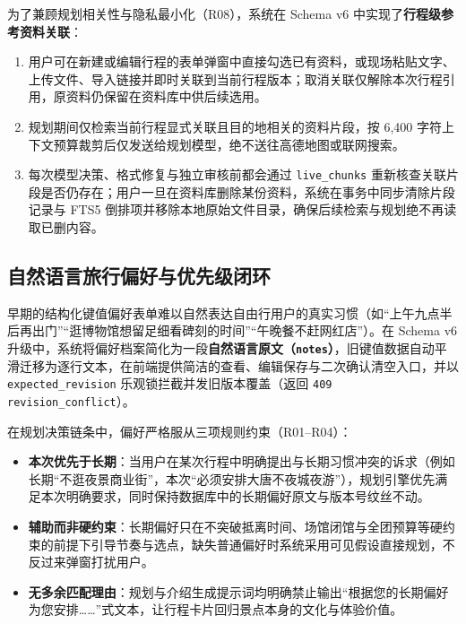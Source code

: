 为了兼顾规划相关性与隐私最小化（R08），系统在 Schema v6 中实现了\textbf{行程级参考资料关联}：
\begin{enumerate}
  \item 用户可在新建或编辑行程的表单弹窗中直接勾选已有资料，或现场粘贴文字、上传文件、导入链接并即时关联到当前行程版本；取消关联仅解除本次行程引用，原资料仍保留在资料库中供后续选用。
  \item 规划期间仅检索当前行程显式关联且目的地相关的资料片段，按 6,400 字符上下文预算裁剪后仅发送给规划模型，绝不送往高德地图或联网搜索。
  \item 每次模型决策、格式修复与独立审核前都会通过 \texttt{live\_chunks} 重新核查关联片段是否仍存在；用户一旦在资料库删除某份资料，系统在事务中同步清除片段记录与 FTS5 倒排项并移除本地原始文件目录，确保后续检索与规划绝不再读取已删内容。
\end{enumerate}

\subsection{自然语言旅行偏好与优先级闭环}

早期的结构化键值偏好表单难以自然表达自由行用户的真实习惯（如“上午九点半后再出门”“逛博物馆想留足细看碑刻的时间”“午晚餐不赶网红店”）。在 Schema v6 升级中，系统将偏好档案简化为一段\textbf{自然语言原文（\texttt{notes}）}，旧键值数据自动平滑迁移为逐行文本，在前端提供简洁的查看、编辑保存与二次确认清空入口，并以 \texttt{expected\_revision} 乐观锁拦截并发旧版本覆盖（返回 \texttt{409 revision\_conflict}）。

在规划决策链条中，偏好严格服从三项规则约束（R01--R04）：
\begin{itemize}
  \item \textbf{本次优先于长期}：当用户在某次行程中明确提出与长期习惯冲突的诉求（例如长期“不逛夜景商业街”，本次“必须安排大唐不夜城夜游”），规划引擎优先满足本次明确要求，同时保持数据库中的长期偏好原文与版本号纹丝不动。
  \item \textbf{辅助而非硬约束}：长期偏好只在不突破抵离时间、场馆闭馆与全团预算等硬约束的前提下引导节奏与选点，缺失普通偏好时系统采用可见假设直接规划，不反过来弹窗打扰用户。
  \item \textbf{无多余匹配理由}：规划与介绍生成提示词均明确禁止输出“根据您的长期偏好为您安排……”式文本，让行程卡片回归景点本身的文化与体验价值。
\end{itemize}
